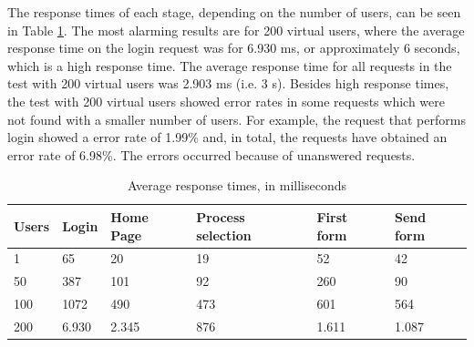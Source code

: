 \documentclass[runningheads,a4paper]{llncs}
\begin{document}

The response times of each stage, depending on the number of users, can be seen in Table \ref{tab:resultadoCarga}. The most alarming results are for 200 virtual users, where the average response time on the login request was for 6.930 ms, or approximately 6 seconds, which is a high response time. The average response time for all requests in the test with 200 virtual users was 2.903 ms (i.e. 3 s). Besides high response times, the test with 200 virtual users showed error rates in some requests which were not found with a smaller number of users. For example, the request that performs login showed a error rate of 1.99\% and, in total, the requests have obtained an error rate of 6.98\%. The errors occurred because of unanswered requests.


\begin{table}
{\scriptsize
\centering
\begin{tabular}{p{2cm}|p{2cm}|p{2cm}|p{2cm}|p{2cm}|p{2cm}}
\hline
Users & Login & Home Page & Process selection & First form & Send form\\\hline
1 & 65 & 20 & 19 & 52 & 42\\\hline
50 & 387 & 101 & 92 & 260 & 90\\\hline
100 & 1072 & 490 & 473 & 601 & 564\\\hline
200 & 6.930 & 2.345 & 876 & 1.611 & 1.087\\\hline
\end{tabular}
}
\caption{Average response times, in milliseconds}
\label{tab:resultadoCarga}
\end{table}
\end{document}
